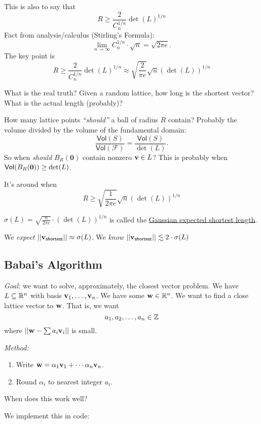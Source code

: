 This is also to say that
\[R\geq \frac{2}{C_n^{1/n}}\det(L)^{1/n}\]
Fact from analysis/calculus (Stirling's Formula):
\[\lim_{n\to\infty}C_n^{1/n}\cdot\sqrt{n} = \sqrt{2\pi e}.\]
The key point is
\[R\geq \frac{2}{C_n^{1/n}}\det(L)^{1/n} \approx \sqrt{\frac{2}{\pi e}}\sqrt{n}(\det(L))^{1/n}\]

\begin{ques*}
    What is the real truth? Given a random lattice, how long is the shortest vector? What is the actual length (probably)?
\end{ques*}
How many lattice points \emph{``should''} a ball of radius $R$ contain? Probably the volume divided by the volume of the fundamental domain:
\[\frac{\mathsf{Vol}(S)}{\mathsf{Vol(\mathcal{F})}} = \frac{\mathsf{Vol}(S)}{\det(L)}.\]
So when \emph{should} $B_R(\textbf{0})$ contain nonzero $\mathbf{v}\in L$? This is probably when $\mathsf{Vol}(B_R(\mathbf{0})) \geq \det(L)$.

It's around when
\[R \geq \sqrt{\frac{1}{2\pi e}}\sqrt{n}(\det(L))^{1/n}\]

\begin{definition}
    $\sigma(L) = \sqrt{\frac{n}{2\pi e}}\cdot (\det(L))^{1/n}$ is called the \ul{Gaussian expected shortest length}.
\end{definition}
We \emph{expect} $||\mathbf{v}_\mathsf{shortest}||\approx\sigma(L)$. We \emph{know} $||\mathbf{v}_\mathsf{shortest}||\lesssim 2\cdot \sigma(L)$

\subsection{Babai's Algorithm}
\emph{Goal:} we want to solve, approximately, the closest vector problem. We have $L\subseteq\mathbb R^n$ with basis $\mathbf{v}_1, \dots, \mathbf{v}_n$. We have some $\mathbf{w}\in\mathbb R^n$. We want to find a close lattice vector to $\mathbf{w}$. That is, we want \[a_1, a_2, \dots, a_n\in\mathbb Z\] where $||\mathbf{w} - \sum a_i\mathbf{v}_i||$ is small.

\emph{Method:}
\begin{enumerate}
    \item Write $\mathbf{w} = \alpha_1\mathbf{v}_1 + \cdots \alpha_n\mathbf{v}_n$.
    \item Round $\alpha_i$ to nearest integer $a_i$.
\end{enumerate}

\begin{ques*}
    When does this work well?
\end{ques*}

We implement this in code:

